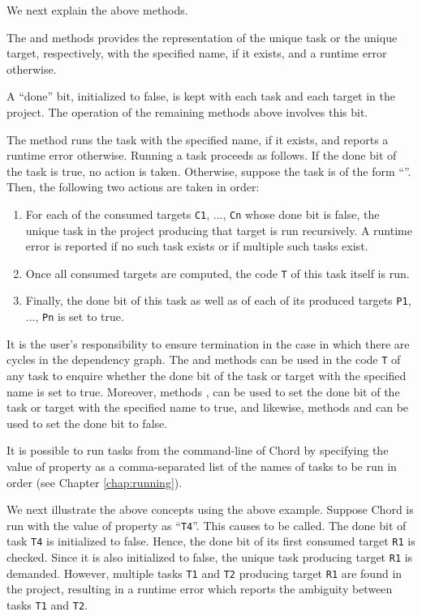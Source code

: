 We next explain the above methods.

The  and  methods provides the representation
of the unique task or the unique target, respectively, with the specified name, if it exists,
and a runtime error otherwise.

A ``done'' bit, initialized to false, is kept with each task and each target in
the project.  The operation of the remaining methods above involves this bit.

The  method runs the task with the specified name, if it exists,
and reports a runtime error otherwise.  Running a task proceeds as follows.
If the done bit of the task is true, no action is taken.  Otherwise, 
suppose the task is of the form ``''.  Then,
the following two actions are taken in order:

\begin{enumerate}
\item
For each of the consumed targets {\tt C1}, ..., {\tt Cn} 
whose done bit is false, the unique task in the project producing that target 
is run recursively.
A runtime error is reported if no such task exists or if multiple such tasks exist.
\item
Once all consumed targets are computed, the code {\tt T} of this task itself is run.
\item
Finally, the done bit of this task as well as of each of its produced targets
{\tt P1}, ..., {\tt Pn} is set to true.
\end{enumerate}

It is the user's responsibility to ensure termination in the case in which there are
cycles in the dependency graph.  The  and 
methods can be used in the code {\tt T} of any task to enquire
whether the done bit of the task or target with the specified name is set to true.
Moreover, methods ,  can be used to set
the done bit of the task or target with the specified name to true, and likewise,
methods  and  can be used
to set the done bit to false.

It is possible to run tasks from the command-line of Chord by specifying the value of property
 as a comma-separated list of the names of tasks to be run in order
(see Chapter \ref{chap:running}).

We next illustrate the above concepts using the above example.
Suppose Chord is run with the value of property  as ``{\tt T4}''.
This causes  to be called.  The done bit of task {\tt T4} is initialized to false.
Hence, the done bit of its first consumed target {\tt R1} is checked.
Since it is also initialized to false, the unique task producing
target {\tt R1} is demanded.  However, multiple tasks {\tt T1} and {\tt T2} 
producing target {\tt R1} are found in the project, resulting in a runtime error which
reports the ambiguity between tasks {\tt T1} and {\tt T2}.

